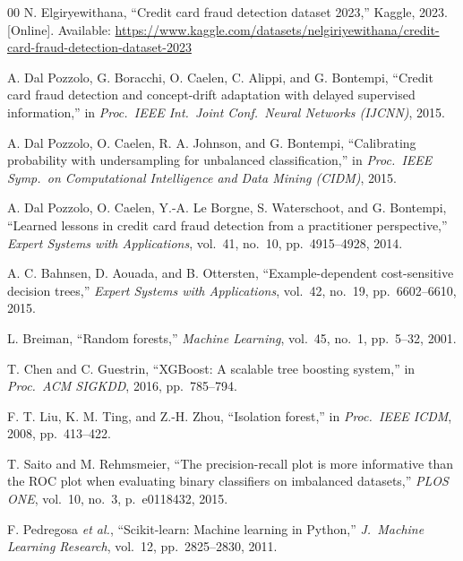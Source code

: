 \documentclass[conference]{IEEEtran}
\begin{document}
\begin{thebibliography}{00}
 N. Elgiryewithana, ``Credit card fraud detection
dataset 2023,'' Kaggle, 2023. [Online]. Available:
\url{https://www.kaggle.com/datasets/nelgiriyewithana/credit-card-fraud-detection-dataset-2023}

 A. Dal Pozzolo, G. Boracchi, O. Caelen, C. Alippi,
and G. Bontempi, ``Credit card fraud detection and concept-drift
adaptation with delayed supervised information,'' in \textit{Proc.\
IEEE Int.\ Joint Conf.\ Neural Networks (IJCNN)}, 2015.

 A. Dal Pozzolo, O. Caelen, R. A. Johnson,
and G. Bontempi, ``Calibrating probability with undersampling for
unbalanced classification,'' in \textit{Proc.\ IEEE Symp.\ on
Computational Intelligence and Data Mining (CIDM)}, 2015.

 A. Dal Pozzolo, O. Caelen, Y.-A. Le Borgne,
S. Waterschoot, and G. Bontempi, ``Learned lessons in credit card
fraud detection from a practitioner perspective,'' \textit{Expert
Systems with Applications}, vol.~41, no.~10, pp.~4915--4928, 2014.

 A. C. Bahnsen, D. Aouada, and
B. Ottersten, ``Example-dependent cost-sensitive decision trees,''
\textit{Expert Systems with Applications}, vol.~42, no.~19,
pp.~6602--6610, 2015.

 L. Breiman, ``Random forests,'' \textit{Machine
Learning}, vol.~45, no.~1, pp.~5--32, 2001.

 T. Chen and C. Guestrin, ``XGBoost: A scalable
tree boosting system,'' in \textit{Proc.\ ACM SIGKDD}, 2016,
pp.~785--794.

 F. T. Liu, K. M. Ting, and Z.-H. Zhou,
``Isolation forest,'' in \textit{Proc.\ IEEE ICDM}, 2008,
pp.~413--422.

 T. Saito and M. Rehmsmeier, ``The precision-recall
plot is more informative than the ROC plot when evaluating binary
classifiers on imbalanced datasets,'' \textit{PLOS ONE}, vol.~10,
no.~3, p.~e0118432, 2015.

 F. Pedregosa \textit{et al.}, ``Scikit-learn:
Machine learning in Python,'' \textit{J.\ Machine Learning Research},
vol.~12, pp.~2825--2830, 2011.

\end{thebibliography}
\end{document}
